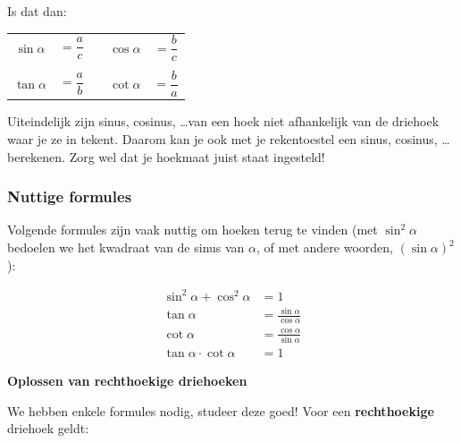 

Is dat dan:

\begin{center}
\begin{tabular}{ccccc}
$\sin \alpha$ &$= \dfrac{a}{c}$ &\qquad\qquad\qquad& $\cos \alpha$ &$= \dfrac{b}{c}$\\
&&&&\\
$\tan \alpha$ &$= \dfrac{a}{b}$ &\qquad\qquad\qquad& $\cot \alpha$ &$= \dfrac{b}{a}$
\end{tabular}
\end{center}

Uiteindelijk zijn sinus, cosinus, \ldots van een hoek niet afhankelijk van de driehoek waar je ze in tekent. Daarom kan je ook met je rekentoestel een sinus, cosinus, \ldots berekenen. Zorg wel dat je hoekmaat juist staat ingesteld!

\subsubsection{Nuttige formules}

Volgende formules zijn vaak nuttig om hoeken terug te vinden (met $\sin^2 \alpha$ bedoelen we het kwadraat van de sinus van $\alpha$, of met andere woorden, $(\sin \alpha)^2$):

\begin{align*}
\sin^2 \alpha + \cos^2 \alpha &= 1\\
\tan \alpha &= \frac{\sin \alpha}{\cos \alpha}\\
\cot \alpha &= \frac{\cos \alpha}{\sin \alpha}\\
\tan \alpha\cdot \cot \alpha &= 1
\end{align*}

\textbf{Oplossen van rechthoekige driehoeken}


We hebben enkele formules nodig, studeer deze goed!  Voor een {\bf rechthoekige} driehoek geldt:



